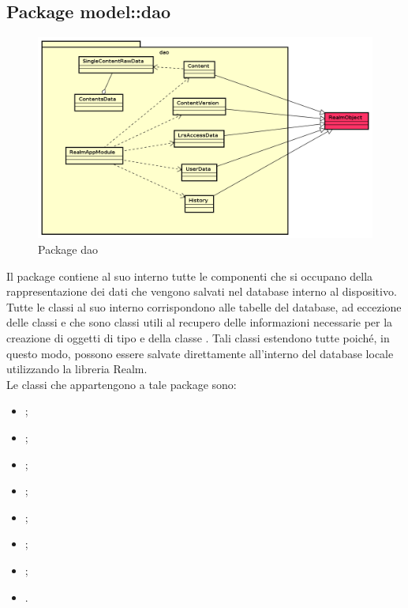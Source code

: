 \documentclass[../Tesi.tex]{subfiles}
\begin{document}
	\subsection{Package model::dao}
		\begin{figure}[H]
			\centering
			\includegraphics[scale=0.5]{images/package_diagrams/dao}
				\caption{Package dao}
			\label{fig:StrutturaMVP}
		\end{figure}
		Il package  contiene al suo interno tutte le componenti che si occupano della rappresentazione dei dati che vengono salvati nel database interno al dispositivo. Tutte le classi al suo interno corrispondono alle tabelle del database, ad eccezione delle classi  e  che sono classi utili al recupero delle informazioni necessarie per la creazione di oggetti di tipo  e della classe . Tali classi estendono tutte  poiché, in questo modo, possono essere salvate direttamente all'interno del database locale utilizzando la libreria Realm. \\
		Le classi che appartengono a tale package sono:
		\begin{itemize}
			\item {};
			\item {};
			\item {};
			\item {};
			\item {};
			\item {};
			\item {};
			\item {}.
		\end{itemize}
\end{document}
